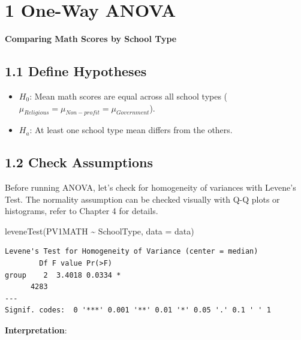 \documentclass[
  letterpaper,
  DIV=11,
  numbers=noendperiod]{scrreprt}
\newenvironment{Shaded}{\begin{snugshade}}{\end{snugshade}}
\newcommand{\AttributeTok}[1]{\textcolor[rgb]{0.40,0.45,0.13}{#1}}
\newcommand{\FunctionTok}[1]{\textcolor[rgb]{0.28,0.35,0.67}{#1}}
\newcommand{\NormalTok}[1]{\textcolor[rgb]{0.00,0.23,0.31}{#1}}
\newcommand{\SpecialCharTok}[1]{\textcolor[rgb]{0.37,0.37,0.37}{#1}}
\begin{document}
\section*{1 One-Way ANOVA}\label{one-way-anova}


\textbf{Comparing Math Scores by School Type}

\subsection*{1.1 Define Hypotheses}\label{define-hypotheses}

\begin{itemize}
\item
  \(H_0\): Mean math scores are equal across all school types
  (\(\mu_{Religious} = \mu_{Non−profit} = \mu_{Government}\)).
\item
  \(H_a\): At least one school type mean differs from the others.
\end{itemize}

\subsection*{1.2 Check Assumptions}\label{check-assumptions}

Before running ANOVA, let's check for homogeneity of variances with
Levene's Test. The normality assumption can be checked visually with Q-Q
plots or histograms, refer to Chapter 4 for details.

\begin{Shaded}
\begin{Highlighting}[]
\FunctionTok{leveneTest}\NormalTok{(PV1MATH }\SpecialCharTok{\textasciitilde{}}\NormalTok{ SchoolType, }\AttributeTok{data =}\NormalTok{ data) }
\end{Highlighting}
\end{Shaded}

\begin{verbatim}
Levene's Test for Homogeneity of Variance (center = median)
        Df F value Pr(>F)  
group    2  3.4018 0.0334 *
      4283                 
---
Signif. codes:  0 '***' 0.001 '**' 0.01 '*' 0.05 '.' 0.1 ' ' 1
\end{verbatim}

\textbf{Interpretation}:
\end{document}

